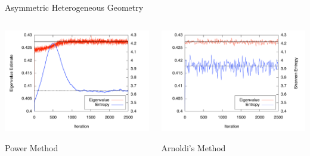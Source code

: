\documentclass[xcolor={usenames, dvipsnames},]{beamer}
\begin{document}
\begin{frame}{Asymmetric Heterogeneous Geometry}
\begin{columns}[t,onlytextwidth]
    \begin{column}{0.5\textwidth}
        \includegraphics[width=1.1\textwidth,keepaspectratio]{Figures/AsymmetricPower}
        \begin{center} \hspace{6ex}Power Method \end{center}
    \end{column}
    \begin{column}{0.5\textwidth}
        \includegraphics[width=1.1\textwidth,keepaspectratio]{Figures/AsymmetricArnoldi}
        \begin{center} \hspace{2ex}Arnoldi's Method \end{center}
    \end{column}
\end{columns}
\end{frame}
\end{document}

